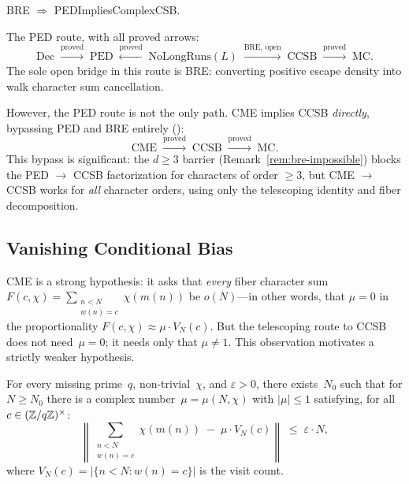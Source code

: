 \begin{theorem}
BRE $\Rightarrow$ PEDImpliesComplexCSB.
\end{theorem}

The PED route, with all proved arrows:
\[
\mathrm{Dec} \;\xrightarrow{\text{proved}}\; \mathrm{PED}
\;\xleftarrow{\text{proved}}\; \mathrm{NoLongRuns}(L)
\;\xrightarrow{\text{BRE, open}}\;
\mathrm{CCSB}
\;\xrightarrow{\text{proved}}\;
\mathrm{MC}.
\]
The sole open bridge in this route is BRE: converting positive escape
density into walk character sum cancellation.

However, the PED route is not the only path.  CME implies CCSB
\emph{directly}, bypassing PED and BRE entirely
():
\[
\mathrm{CME}
\;\xrightarrow{\text{proved}}\;
\mathrm{CCSB}
\;\xrightarrow{\text{proved}}\;
\mathrm{MC}.
\]
This bypass is significant: the $d \geq 3$ barrier
(Remark~\ref{rem:bre-impossible}) blocks the PED $\to$ CCSB
factorization for characters of order $\geq 3$, but CME $\to$ CCSB
works for \emph{all} character orders, using only the telescoping
identity and fiber decomposition.

\subsection{Vanishing Conditional Bias}
\label{sec:vcb}

CME is a strong hypothesis: it asks that \emph{every} fiber character
sum $F(c, \chi) = \sum_{\substack{n < N \\ w(n) = c}} \chi(m(n))$ be
$o(N)$---in other words, that $\mu = 0$ in the proportionality
$F(c, \chi) \approx \mu \cdot V_N(c)$.  But the telescoping route to
CCSB does not need~$\mu = 0$; it needs only that $\mu \neq 1$.  This
observation motivates a strictly weaker hypothesis.

\begin{property}
\label{def:vcb}%
For every missing prime~$q$, non-trivial~$\chi$, and $\varepsilon > 0$,
there exists~$N_0$ such that for $N \geq N_0$ there is a complex
number~$\mu = \mu(N, \chi)$ with $|\mu| \leq 1$ satisfying, for all
$c \in (\mathbb{Z}/q\mathbb{Z})^\times$:
\[
  \left\|\sum_{\substack{n < N \\ w(n) = c}} \chi(m(n))
    \;-\; \mu \cdot V_N(c)\right\|
  \;\leq\; \varepsilon \cdot N,
\]
where $V_N(c) = |\{n < N : w(n) = c\}|$ is the visit count.
\end{property}

